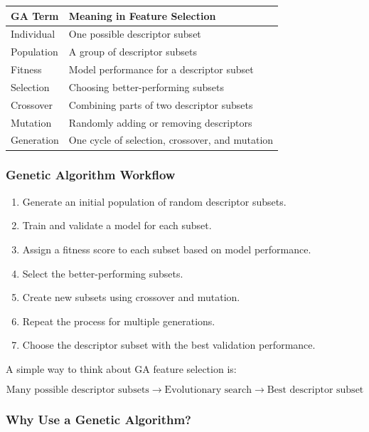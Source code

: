 \documentclass[11pt]{report}
\newenvironment{Important note}{\begin{quote}\color{red}\textbf{Important note:} }{\end{quote}}
\begin{document}
\begin{center}
\begin{tabular}{ll}
\toprule
\textbf{GA Term} & \textbf{Meaning in Feature Selection} \\
\midrule
Individual & One possible descriptor subset \\
Population & A group of descriptor subsets \\
Fitness & Model performance for a descriptor subset \\
Selection & Choosing better-performing subsets \\
Crossover & Combining parts of two descriptor subsets \\
Mutation & Randomly adding or removing descriptors \\
Generation & One cycle of selection, crossover, and mutation \\
\bottomrule
\end{tabular}
\end{center}

\subsubsection*{Genetic Algorithm Workflow}

\begin{enumerate}[leftmargin=*]
    \item Generate an initial population of random descriptor subsets.
    \item Train and validate a model for each subset.
    \item Assign a fitness score to each subset based on model performance.
    \item Select the better-performing subsets.
    \item Create new subsets using crossover and mutation.
    \item Repeat the process for multiple generations.
    \item Choose the descriptor subset with the best validation performance.
\end{enumerate}

A simple way to think about GA feature selection is:

\[
\text{Many possible descriptor subsets} \rightarrow \text{Evolutionary search} \rightarrow \text{Best descriptor subset}
\]

\subsubsection*{Why Use a Genetic Algorithm?}
\end{document}

